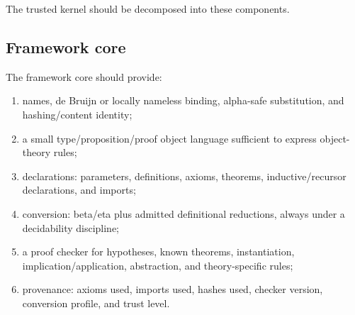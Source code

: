 \documentclass[11pt]{article}
\newcommand{\MeTTa}{\textup{MeTTa}}
\newcommand{\HOTG}{\textup{HOTG}}
\newcommand{\DTT}{\textup{DTT}}
\newcommand{\MTT}{\textup{MTT}}
\begin{document}
\begin{center}
\end{center}

The trusted kernel should be decomposed into these components.

\subsection{Framework core}

The framework core should provide:

\begin{enumerate}
\item names, de Bruijn or locally nameless binding, alpha-safe substitution, and hashing/content identity;
\item a small type/proposition/proof object language sufficient to express object-theory rules;
\item declarations: parameters, definitions, axioms, theorems, inductive/recursor declarations, and imports;
\item conversion: beta/eta plus admitted definitional reductions, always under a decidability discipline;
\item a proof checker for hypotheses, known theorems, instantiation, implication/application, abstraction, and theory-specific rules;
\item provenance: axioms used, imports used, hashes used, checker version, conversion profile, and trust level.
\end{enumerate}
\end{document}
